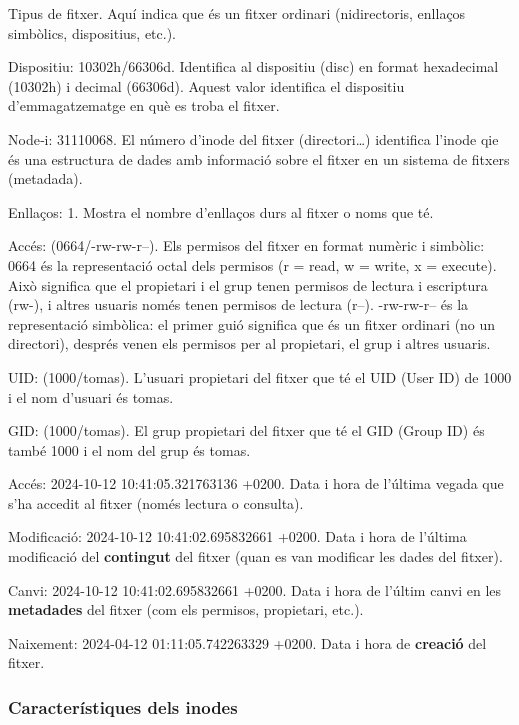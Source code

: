 \documentclass[
  12 pt,
  a4paper,
]{article}
\begin{document}
Tipus de fitxer. Aquí indica que és un fitxer ordinari (nidirectoris,
enllaços simbòlics, dispositius, etc.).

Dispositiu: 10302h/66306d. Identifica al dispositiu (disc) en format
hexadecimal (10302h) i decimal (66306d). Aquest valor identifica el
dispositiu d'emmagatzematge en què es troba el fitxer.

Node‐i: 31110068. El número d'inode del fitxer (directori\ldots)
identifica l'inode qie és una estructura de dades amb informació sobre
el fitxer en un sistema de fitxers (metadada).

Enllaços: 1. Mostra el nombre d'enllaços durs al fitxer o noms que té.

Accés: (0664/-rw-rw-r--). Els permisos del fitxer en format numèric i
simbòlic: 0664 és la representació octal dels permisos (r = read, w =
write, x = execute). Això significa que el propietari i el grup tenen
permisos de lectura i escriptura (rw-), i altres usuaris només tenen
permisos de lectura (r--). -rw-rw-r-- és la representació simbòlica: el
primer guió significa que és un fitxer ordinari (no un directori),
després venen els permisos per al propietari, el grup i altres usuaris.

UID: (1000/tomas). L'usuari propietari del fitxer que té el UID (User
ID) de 1000 i el nom d'usuari és tomas.

GID: (1000/tomas). El grup propietari del fitxer que té el GID (Group
ID) és també 1000 i el nom del grup és tomas.

Accés: 2024-10-12 10:41:05.321763136 +0200. Data i hora de l'última
vegada que s'ha accedit al fitxer (només lectura o consulta).

Modificació: 2024-10-12 10:41:02.695832661 +0200. Data i hora de
l'última modificació del \textbf{contingut} del fitxer (quan es van
modificar les dades del fitxer).

Canvi: 2024-10-12 10:41:02.695832661 +0200. Data i hora de l'últim canvi
en les \textbf{metadades} del fitxer (com els permisos, propietari,
etc.).

Naixement: 2024-04-12 01:11:05.742263329 +0200. Data i hora de
\textbf{creació} del fitxer.

\subsubsection{Característiques dels
inodes}\label{caracteruxedstiques-dels-inodes}
\end{document}
